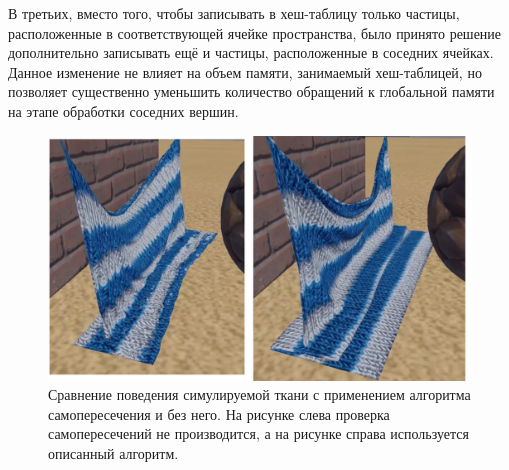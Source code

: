 	В третьих, вместо того, чтобы записывать в хеш-таблицу только частицы, расположенные в соответствующей ячейке пространства, было принято решение дополнительно записывать ещё и частицы, расположенные в соседних ячейках. Данное изменение не влияет на объем памяти, занимаемый хеш-таблицей, но позволяет существенно уменьшить количество обращений к глобальной памяти на этапе обработки соседних вершин.
	
		
	\begin{figure}[ht!] 
		\center
		\includegraphics [scale=0.45] {my_folder/images//selfCollisionOffOn}
		\caption{Сравнение поведения симулируемой ткани с применением алгоритма самопересечения и без него. На рисунке слева проверка самопересечений не производится, а на рисунке справа используется описанный алгоритм.}
		\label{fig:selfCollision}  
	\end{figure}	
	\FloatBarrier

%
